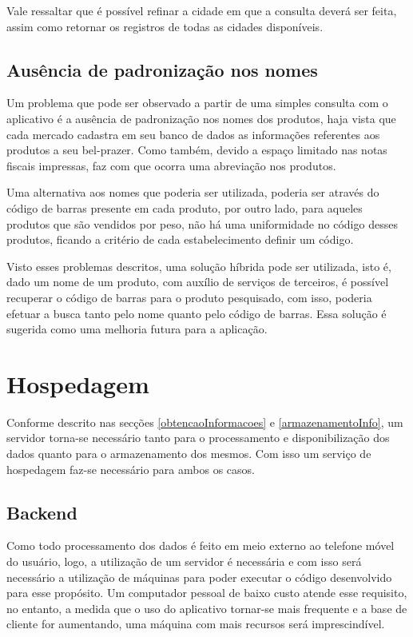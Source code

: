 Vale ressaltar que é possível refinar a cidade em que a consulta deverá ser feita, assim como retornar os registros de todas as cidades disponíveis.

\subsection{Ausência de padronização nos nomes}

Um problema que pode ser observado a partir de uma simples consulta com o aplicativo é a ausência de padronização nos nomes dos produtos, haja vista que cada mercado cadastra em seu banco de dados as informações referentes aos produtos a seu bel-prazer. Como também, devido a espaço limitado nas notas fiscais impressas, faz com que ocorra uma abreviação nos produtos.

Uma alternativa aos nomes que poderia ser utilizada, poderia ser através do código de barras presente em cada produto, por outro lado, para aqueles produtos que são vendidos por peso, não há uma uniformidade no código desses produtos, ficando a critério de cada estabelecimento definir um código.

Visto esses problemas descritos, uma solução híbrida pode ser utilizada, isto é, dado um nome de um produto, com auxílio de serviços de terceiros, é possível recuperar o código de barras para o produto pesquisado, com isso, poderia efetuar a busca tanto pelo nome quanto pelo código de barras. Essa solução é sugerida como uma melhoria futura para a aplicação.

\section{Hospedagem}

Conforme descrito nas secções \ref{obtencaoInformacoes} e \ref{armazenamentoInfo}, um servidor torna-se necessário tanto para o processamento e disponibilização dos dados quanto para o armazenamento dos mesmos. Com isso um serviço de hospedagem faz-se necessário para ambos os casos.

\subsection{Backend}

Como todo processamento dos dados é feito em meio externo ao telefone móvel do usuário, logo, a utilização de um servidor é necessária e com isso será necessário a utilização de máquinas para poder executar o código desenvolvido para esse propósito. Um computador pessoal de baixo custo atende esse requisito, no entanto, a medida que o uso do aplicativo tornar-se mais frequente e a base de cliente for aumentando, uma máquina com mais recursos será imprescindível.

